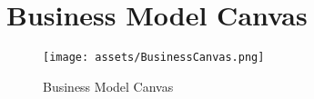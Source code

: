 \chapter{Business Model Canvas}
\begin{figure}[htp]
    \centering
    \texttt{[image: assets/BusinessCanvas.png]}
    \caption{Business Model Canvas}
    \label{fig:Business Model Canvas}
\end{figure}

